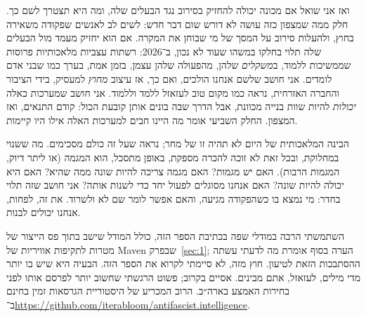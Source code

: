ואז אני שואל אם מכונה יכולה להחזיק בסירוב נגד הבעלים שלה, ומה היא תצטרך לשם כך. חלק ממה שמצפון כזה עושה לא דורש שום דבר חדש: לשים לב לאנשים שפקודה משאירה בחוץ, ולהעלות סירוב על המסך של מי שבוחן את המקרה. אם הוא יחזיק מעמד מול הבעלים שלה תלוי בחלקו במשהו שעוד לא נכון, ב־2026: רשתות עצביות מלאכותיות פרוסות שממשיכות ללמוד, ב\emph{משקלים} שלהן, מהפעולה שלהן עצמן, בזמן אמת, בערך כמו שבני אדם לומדים. אני חושב שלשם אנחנו הולכים, ואם כך, אז עיצוב \emph{מחוץ} למעסיק, בידי הציבור והחברה האזרחית, נראה כמו מקום טוב לעזאזל ללמד וללמוד. אני חושב שמערכות כאלה \emph{יכולות} להיות שוות בנייה מכוונת, אבל הדרך שבה בונים אותן קובעת הכול: קודם התנאים, ואז המצפון. החלק השביעי אומר מה היינו חבים למערכות האלה אילו היו קיימות.

הבינה המלאכותית של היום לא תהיה זו של מחר; נראה שעל זה כולם מסכימים. מה ששנוי במחלוקת, ובכל זאת לא זוכה להכרה מספקת, באופן מתסכל, הוא המגמה (או ליתר דיוק, המגמות הרבות). האם יש מגמות? האם מגמה צריכה להיות שונה ממה שהיא? האם היא יכולה להיות שונה? האם אנחנו מסוגלים לפעול יחד כדי לשנות אותה? אני חושב שזה תלוי בחדר: מי נמצא בו כשהפקודה מגיעה, והאם אפשר לומר שם לא ולשרוד. את זה, לפחות, אנחנו יכולים לבנות.

השתמשתי הרבה במודלי שפה בכתיבת הספר הזה, כולל המודל שישב בתוך פס הייצור של מטרות לתקיפות אוויריות של Maven שבפרק~\ref{sec:1}; הערה בסוף אומרת מה לדעתי עשתה ההסתבכות הזאת לטיעון. חוץ מזה, לא סיימתי לקרוא את הספר הזה. הבעיה היא שיש בו יותר מדי מילים, לעזאזל, אתם מבינים. אסיים בקרוב; פשוט הרגשתי שחשוב יותר לפרסם אותו לפני בחירות האמצע בארה״ב. הרוב המכריע של היסטוריית הגרסאות זמין בחינם ב־\url{https://github.com/iterabloom/antifascist.intelligence}.
